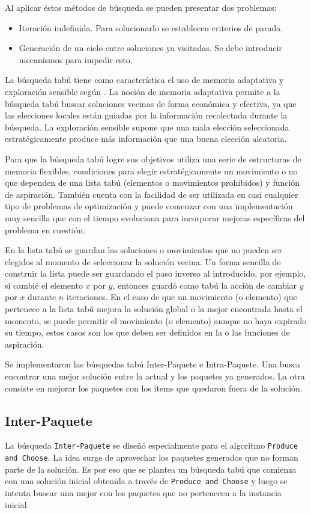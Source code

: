 Al aplicar éstos métodos de búsqueda se pueden presentar dos problemas:
\begin{itemize}
	\item Iteración indefinida. Para solucionarlo se establecen criterios de parada.
	\item Generación de un ciclo entre soluciones ya visitadas. Se debe introducir mecanismos para impedir esto.
\end{itemize}

La búsqueda tabú tiene como característica el uso de memoria adaptativa y exploración sensible según \cite{tabuSearch}. La noción de memoria adaptativa permite a la búsqueda tabú buscar soluciones vecinas de forma económica y efectiva, ya que las elecciones locales están guiadas por la información recolectada durante la búsqueda. La exploración sensible supone que una mala elección seleccionada estratégicamente produce más información que una buena elección aleatoria.

Para que la búsqueda tabú logre sus objetivos utiliza una serie de estructuras de memoria flexibles, condiciones para elegir estratégicamente un movimiento o no que dependen de una lista tabú (elementos o movimientos prohibidos) y función de aspiración. También cuenta con la facilidad de ser utilizada en casi cualquier tipo de problemas de optimización y puede comenzar con una implementación muy sencilla que con el tiempo evoluciona para incorporar mejoras específicas del problema en cuestión.

En la lista tabú se guardan las soluciones o movimientos que no pueden ser elegidos al momento de seleccionar la solución vecina. Un forma sencilla de construir la lista puede ser guardando el paso inverso al introducido, por ejemplo, si cambié el elemento $x$ por $y$, entonces guardó como tabú la acción de cambiar $y$ por $x$ durante $n$ iteraciones. En el caso de que un movimiento (o elemento) que pertenece a la lista tabú mejora la solución global o la mejor encontrada hasta el momento, se puede permitir el movimiento (o elemento) aunque no haya expirado su tiempo, estos casos son los que deben ser definidos en la o las funciones de aspiración.

Se implementaron las búsquedas tabú Inter-Paquete e Intra-Paquete. Una busca encontrar una mejor solución entre la actual y los paquetes ya generados. La otra consiste en mejorar los paquetes con los ítems que quedaron fuera de la solución.

\subsection{Inter-Paquete}
La búsqueda \texttt{Inter-Paquete} se diseñó especialmente para el algoritmo \texttt{Produce and Choose}. La idea surge de aprovechar los paquetes generados que no forman parte de la solución. Es por eso que se plantea un búsqueda tabú que comienza con una solución inicial obtenida a través de \texttt{Produce and Choose} y luego se intenta buscar una mejor con los paquetes que no pertenecen a la instancia inicial. 

